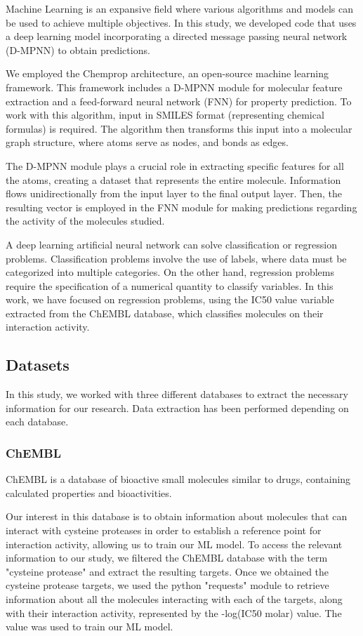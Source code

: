 \documentclass[final,times,twocolumn,article]{elsarticle}
\begin{document}
Machine Learning is an expansive field where various algorithms and models can be used to achieve multiple objectives. In this study, we developed code that uses a deep learning model incorporating a directed message passing neural network (D-MPNN) to obtain predictions. 

We employed the Chemprop architecture, an open-source machine learning framework. This framework includes a D-MPNN module for molecular feature extraction and a feed-forward neural network (FNN) for property prediction. To work with this algorithm, input in SMILES format (representing chemical formulas) is required. The algorithm then transforms this input into a molecular graph structure, where atoms serve as nodes, and bonds as edges. 

The D-MPNN module plays a crucial role in extracting specific features for all the atoms, creating a dataset that represents the entire molecule. Information flows unidirectionally from the input layer to the final output layer. Then, the resulting vector is employed in the FNN module for making predictions regarding the activity of the molecules studied. \cite{Wang2022}

A deep learning artificial neural network can solve classification or regression problems. Classification problems involve the use of labels, where data must be categorized into multiple categories. On the other hand, regression problems require the specification of a numerical quantity to classify variables. In this work, we have focused on regression problems, using the IC50 value variable extracted from the ChEMBL database, which classifies molecules on their interaction activity. 

\subsection{Datasets}

In this study, we worked with three different databases to extract the necessary information for our research. Data extraction has been performed depending on each database.  

\subsubsection{ChEMBL}

ChEMBL is a database of bioactive small molecules similar to drugs, containing calculated properties and bioactivities. \cite{chemblweb}

Our interest in this database is to obtain information about molecules that can interact with cysteine proteases in order to establish a reference point for interaction activity, allowing us to train our ML model. To access the relevant information to our study, we filtered the ChEMBL database with the term "cysteine protease" and extract the resulting targets. Once we obtained the cysteine protease targets, we used the python "requests" module to retrieve information about all the molecules interacting with each of the targets, along with their interaction activity, represented by the -log(IC50 molar) value. The value was used to train our ML model. 
\end{document}
